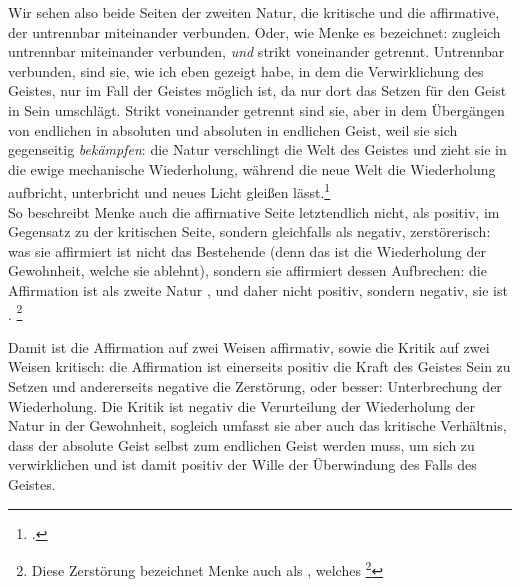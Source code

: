 \documentclass[12pt, a4paper, openany]{report}
\begin{document}
Wir sehen also beide Seiten der zweiten Natur, die kritische und die affirmative, der untrennbar miteinander verbunden. 
Oder, wie Menke es bezeichnet: zugleich untrennbar miteinander verbunden, \emph{und} strikt voneinander getrennt.
Untrennbar verbunden, sind sie, wie ich eben gezeigt habe, in dem die Verwirklichung des Geistes, nur im Fall der Geistes möglich ist, da nur dort das Setzen für den Geist in Sein umschlägt. 
Strikt voneinander getrennt sind sie, aber in dem Übergängen von endlichen in absoluten und absoluten in endlichen Geist, weil sie sich gegenseitig \emph{bekämpfen}:
die Natur verschlingt die Welt des Geistes und zieht sie in die ewige mechanische Wiederholung, während die neue Welt die Wiederholung aufbricht, unterbricht und neues Licht gleißen lässt.\footcite[Vgl.][147]{menke_autonomie_2018}\\
So beschreibt Menke auch die affirmative Seite letztendlich nicht, als positiv, im Gegensatz zu der kritischen Seite, sondern gleichfalls als negativ, zerstörerisch:
was sie affirmiert ist nicht das Bestehende (denn das ist die Wiederholung der Gewohnheit, welche sie ablehnt), sondern sie affirmiert dessen Aufbrechen: 
die Affirmation ist als  zweite Natur , und daher nicht positiv, sondern negativ, sie ist .%
\footnote{
    \cite[][S. 148. Hervorhebung von mir.]{menke_autonomie_2018}
    Diese Zerstörung bezeichnet Menke auch als , welches \footcite[][147]{menke_autonomie_2018}
}

Damit ist die Affirmation auf zwei Weisen affirmativ, sowie die Kritik auf zwei Weisen kritisch: 
die Affirmation ist einerseits positiv die Kraft des Geistes Sein zu Setzen und andererseits negative die Zerstörung, oder besser: Unterbrechung der Wiederholung. 
Die Kritik ist negativ die Verurteilung der Wiederholung der Natur in der Gewohnheit, sogleich umfasst sie aber auch das kritische Verhältnis, dass der absolute Geist selbst zum endlichen Geist werden muss, um sich zu verwirklichen und ist damit positiv der Wille der Überwindung des Falls des Geistes.\\
\end{document}
